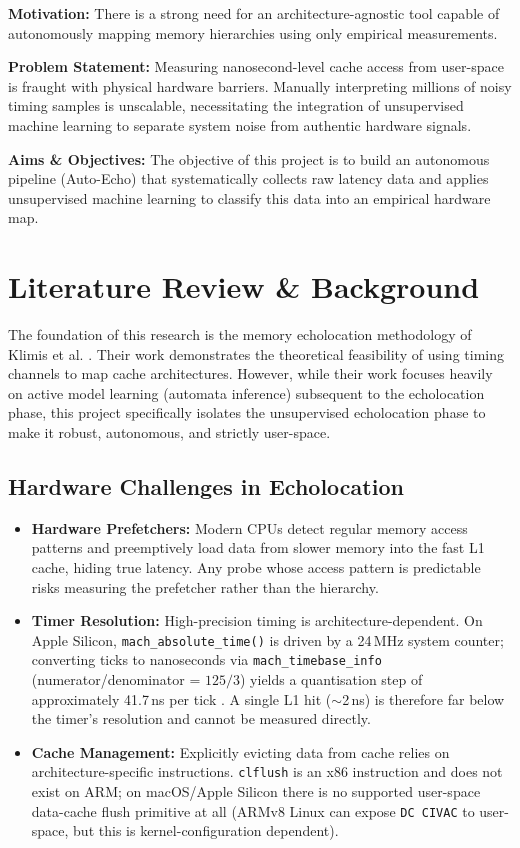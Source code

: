 \documentclass[conference]{IEEEtran}
\begin{document}
\textbf{Motivation:} There is a strong need for an architecture-agnostic tool capable of autonomously mapping memory hierarchies using only empirical measurements. 

\textbf{Problem Statement:} Measuring nanosecond-level cache access from user-space is fraught with physical hardware barriers. Manually interpreting millions of noisy timing samples is unscalable, necessitating the integration of unsupervised machine learning to separate system noise from authentic hardware signals.

\textbf{Aims \& Objectives:} The objective of this project is to build an autonomous pipeline (Auto-Echo) that systematically collects raw latency data and applies unsupervised machine learning to classify this data into an empirical hardware map.

\section{Literature Review \& Background}
The foundation of this research is the memory echolocation methodology of Klimis et al. \cite{klimis2025}. Their work demonstrates the theoretical feasibility of using timing channels to map cache architectures. However, while their work focuses heavily on active model learning (automata inference) subsequent to the echolocation phase, this project specifically isolates the unsupervised echolocation phase to make it robust, autonomous, and strictly user-space.

\subsection{Hardware Challenges in Echolocation}
\begin{itemize}
    \item \textbf{Hardware Prefetchers:} Modern CPUs detect regular memory access patterns and preemptively load data from slower memory into the fast L1 cache, hiding true latency. Any probe whose access pattern is predictable risks measuring the prefetcher rather than the hierarchy.
    \item \textbf{Timer Resolution:} High-precision timing is architecture-dependent. On Apple Silicon, \texttt{mach\_absolute\_time()} is driven by a 24\,MHz system counter; converting ticks to nanoseconds via \texttt{mach\_timebase\_info} (numerator/denominator = $125/3$) yields a quantisation step of approximately 41.7\,ns per tick \cite{apple_mach}. A single L1 hit ($\sim$2\,ns) is therefore far below the timer's resolution and cannot be measured directly.
    \item \textbf{Cache Management:} Explicitly evicting data from cache relies on architecture-specific instructions. \texttt{clflush} is an x86 instruction and does not exist on ARM; on macOS/Apple Silicon there is no supported user-space data-cache flush primitive at all (ARMv8 Linux can expose \texttt{DC CIVAC} to user-space, but this is kernel-configuration dependent).
\end{itemize}
\end{document}

